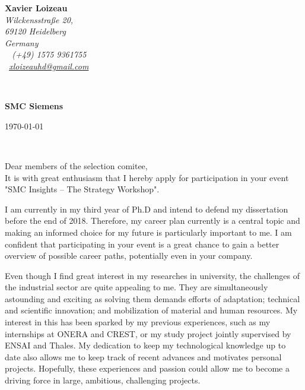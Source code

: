 \documentclass[11pt]{article}
\begin{document}
\sffamily   %
\hfill%
\begin{minipage}[t]{.6\textwidth}
\raggedleft%
{\bfseries Xavier Loizeau}\\[.35ex]
\small\itshape%
Wilckensstra\ss e 20,\\
69120 Heidelberg\\
Germany\\[.35ex]
\faMobile~ (+49) 1575 9361755\\
\faAt~\href{mailto:xloizeauhd@gmail.com}{xloizeauhd@gmail.com}
\end{minipage}\\[1em]
%
\begin{minipage}[t]{.4\textwidth}
\raggedright%
{\bfseries SMC Siemens}\\[.35ex]
\end{minipage}
\hfill %
\begin{minipage}[t]{.4\textwidth}
\raggedleft %
\today
\end{minipage}\\[2em]
\raggedright
Dear members of the selection comitee,\\[1.5em]
%
It is with great enthusiasm that I hereby apply for participation in your event "SMC Insights – The Strategy Workshop".

\medskip

I am currently in my third year of Ph.D and intend to defend my dissertation before the end of 2018.
Therefore, my career plan currently is a central topic and making an informed choice for my future is particularly important to me.
I am confident that participating in your event is a great chance to gain a better overview of possible career paths, potentially even in your company.

\medskip

Even though I find great interest in my researches in university, the challenges of the industrial sector are quite appealing to me.
They are simultaneously astounding and exciting as solving them demands efforts of adaptation; technical and scientific innovation; and mobilization of material and human resources.
My interest in this has been sparked by my previous experiences, such as my internships at ONERA and CREST, or my study project jointly supervised by ENSAI and Thales.
My dedication to keep my technological knowledge up to date also allows me to keep track of recent advances and motivates personal projects.
Hopefully, these experiences and passion could allow me to become a driving force in large, ambitious, challenging projects.
\end{document}
